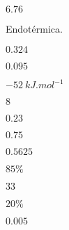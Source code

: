 \begin{answers}
\begin{answers}
\end{answers}

\item 
\begin{answers}
[start = 1]\item \(\num{6,76}\)

\item Endotérmica.

\end{answers}

\item 
\begin{answers}
[start = 1]\item \(\num{0,324}\)

\item \(\num{0,095}\)

\item \(\qty{-52}{\unit{kJ.mol^{-1}}}\)

\end{answers}

\item 
\begin{answers}
[start = 1]\item \(\num{8}\)

\item \(\num{0,23}\)

\end{answers}

\item 
\begin{answers}
[start = 1]\item \(\num{0,75}\)

\item \(\num{0,5625}\)

\end{answers}

\item 
\begin{answers}
[start = 1]\item \(85\%\)

\item \(\num{33}\)

\end{answers}

\item 
\begin{answers}
[start = 1]\item \(20\%\)

\item \(\num{0,005}\)

\end{answers}


\end{answers}
